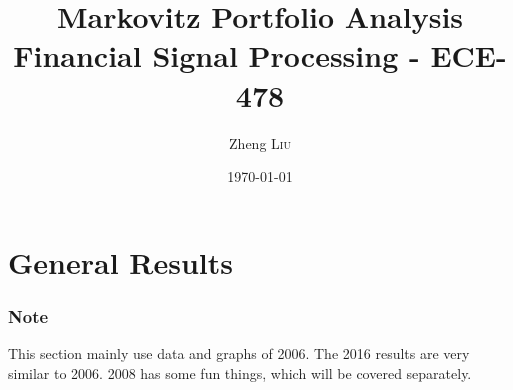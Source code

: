 \documentclass{article}
\title{ Markovitz Portfolio Analysis  \\ Financial Signal Processing - ECE-478} %
\author{Zheng \textsc{Liu}} %
\date{\today} %
\begin{document}
\maketitle %




\section*{General Results}

\subsubsection*{Note}
This section mainly use data and graphs of 2006. The 2016 results are very similar to 2006. 2008 has some fun things, which will be covered separately. 

\subsubsection*{}
\end{document}
